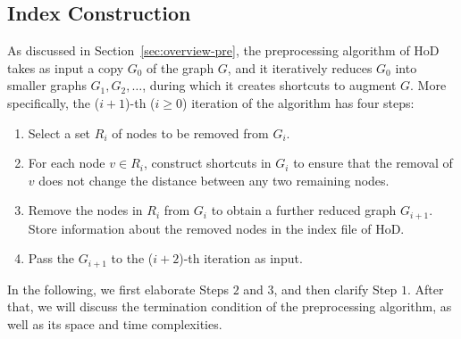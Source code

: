 \documentclass{sig-alternate}
\def\vgap{\vspace{0mm}}
\def\G{G^*}
\begin{document}
\begin{sloppy}
%
%
%




\section{Index Construction}\label{sec:pre}

As discussed in Section~\ref{sec:overview-pre}, the preprocessing algorithm of HoD takes as input a copy $G_0$ of the graph $G$, and it iteratively reduces $G_0$ into smaller graphs $G_1, G_2, \ldots$, during which it creates shortcuts to augment $G$. More specifically, the ($i{+}1$)-th ($i \ge 0$) iteration of the algorithm has four steps:
\begin{enumerate} [itemsep = 0.5mm, topsep = 2mm] %
\item Select a set $R_i$ of nodes to be removed from $G_{i}$.

\item For each node $v \in R_i$, construct shortcuts in $G_{i}$ to ensure that the removal of $v$ does not change the distance between any two remaining nodes.

\item Remove the nodes in $R_i$ from $G_{i}$ to obtain a further reduced graph $G_{i+1}$. Store information about the removed nodes in the index file of HoD.

\item Pass the $G_{i+1}$ to the ($i{+}2$)-th iteration as input.
\end{enumerate}
In the following, we first elaborate Steps $2$ and $3$, and then clarify Step $1$. After that, we will discuss the termination condition of the preprocessing algorithm, as well as its space and time complexities.


\end{sloppy}
\end{document}
